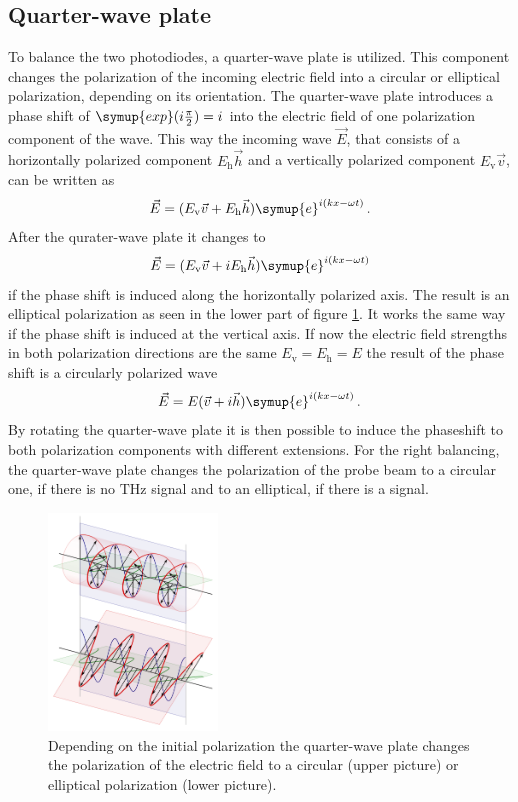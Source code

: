 \subsection{Quarter-wave plate}
\label{sec:qwp}
To balance the two photodiodes, a quarter-wave plate is utilized.
This component changes the polarization of the incoming electric field into a circular or elliptical polarization, depending on its orientation.
The quarter-wave plate introduces a phase shift of $\symup{exp}(i\frac{\pi}{2}) = i$ into the electric field of one polarization component of the wave.
This way the incoming wave $\vec{E}$, that consists of a horizontally polarized component $E_\text{h}\vec{h}$ and a vertically polarized component $E_\text{v}\vec{v}$, can be written as
\begin{equation}
    \vec{E} = (E_\text{v}\vec{v} + E_\text{h}\vec{h})\symup{e}^{i(kx-\omega t)} \, .
\end{equation}
After the qurater-wave plate it changes to 
\begin{equation}
    \vec{E} = (E_\text{v}\vec{v} + i E_\text{h}\vec{h})\symup{e}^{i(kx-\omega t)}
\end{equation}
if the phase shift is induced along the horizontally polarized axis.
The result is an elliptical polarization as seen in the lower part of figure \ref{fig:qwp}.
It works the same way if the phase shift is induced at the vertical axis.
If now the electric field strengths in both polarization directions are the same $E_\text{v} = E_\text{h} = E$ the result of the phase shift is a circularly polarized wave \cite{qwp_book}
\begin{equation}
    \vec{E} = E(\vec{v} + i\vec{h})\symup{e}^{i(kx-\omega t)} \, .
\end{equation}
By rotating the quarter-wave plate it is then possible to induce the phaseshift to both polarization components with different extensions.
For the right balancing, the quarter-wave plate changes the polarization of the probe beam to a circular one, if there is no $\si{\tera\hertz}$ signal and to an elliptical, if there is a signal.
\begin{figure}
    \centering
    \includegraphics[width=0.4\textwidth]{refferenced_pic/qwp.png}
    \caption{Depending on the initial polarization the quarter-wave plate changes the polarization of the electric field to a circular (upper picture) or elliptical polarization (lower picture).}
    \label{fig:qwp}
\end{figure}
\FloatBarrier
